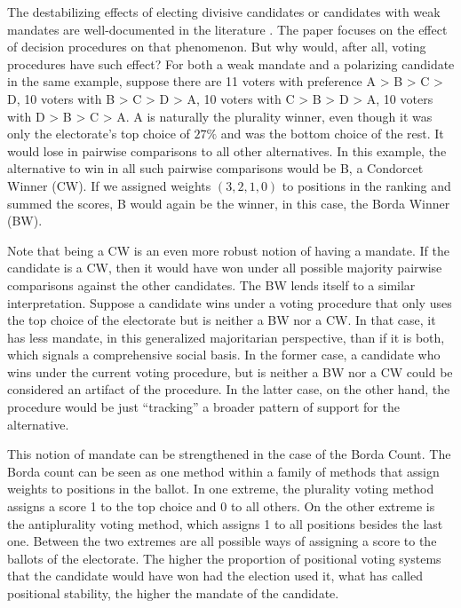 \documentclass[hidelinks,11pt]{article}
\begin{document}
The destabilizing effects of electing divisive candidates or candidates with
weak mandates are well-documented in the literature
\parencite{kaminski2015empirical, luhrmann2018democracy, Baldassarrie2116863118,
  Bednare2113843118}. The paper focuses on the effect of decision procedures on
that phenomenon. But why would, after all, voting procedures have such effect?
For both a weak mandate and a polarizing candidate in the same example, suppose
there are 11 voters with preference A > B > C > D, 10 voters with B > C > D > A,
10 voters with C > B > D > A, 10 voters with D > B > C > A. A is naturally the
plurality winner, even though it was only the electorate's top choice of
\(27\%\) and was the bottom choice of the rest. It would lose in pairwise
comparisons to all other alternatives. In this example, the alternative to win
in all such pairwise comparisons would be B, a Condorcet Winner (CW). If we
assigned weights \((3,2,1,0)\) to positions in the ranking and summed the
scores, B would again be the winner, in this case, the Borda Winner (BW).


Note that being a CW is an even more robust notion of having a mandate. If the
candidate is a CW, then it would have won under all possible majority pairwise
comparisons against the other candidates. The BW lends itself to a similar
interpretation. Suppose a candidate wins under a voting procedure that only uses
the top choice of the electorate but is neither a BW nor a CW. In that case, it
has less mandate, in this generalized majoritarian perspective, than if it is
both, which signals a comprehensive social basis. In the former case, a
candidate who wins under the current voting procedure, but is neither a BW nor a
CW could be considered an artifact of the procedure. In the latter case, on the
other hand, the procedure would be just ``tracking'' a broader pattern of
support for the alternative.


This notion of mandate can be strengthened in the case of the Borda Count. The
Borda count can be seen as one method within a family of methods that assign
weights to positions in the ballot. In one extreme, the plurality voting method
assigns a score 1 to the top choice and 0 to all others. On the other extreme is
the antiplurality voting method, which assigns 1 to all positions besides the
last one. Between the two extremes are all possible ways of assigning a score to
the ballots of the electorate. The higher the proportion of positional voting
systems that the candidate would have won had the election used it, what
\textcite{tabarrok2001president} has called positional stability, the higher the
mandate of the candidate.
\end{document}
